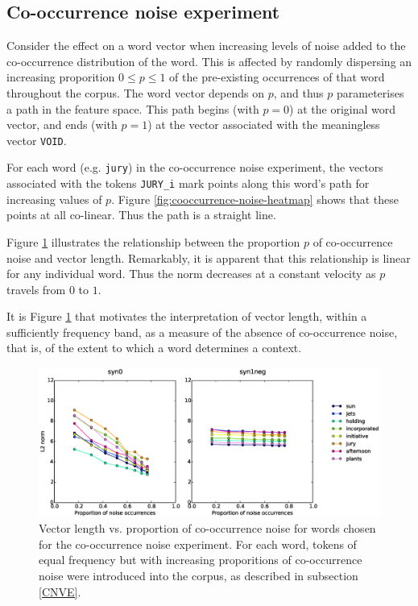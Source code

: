 \documentclass{article} %
\newcommand{\word}[1]{\texttt{#1}}
\begin{document}
\subsection{Co-occurrence noise experiment}
Consider the effect on a word vector when increasing levels of noise added to the co-occurrence distribution of the word.
This is affected by randomly dispersing an increasing proporition $0 \leqslant p \leqslant 1$ of the pre-existing occurrences of that word throughout the corpus.
The word vector depends on $p$, and thus $p$ parameterises a path in the feature space.
This path begins (with $p=0$) at the original word vector, and ends (with $p=1$) at the vector associated with the meaningless vector \word{VOID}.

For each word (e.g. \word{jury}) in the co-occurrence noise experiment, the vectors associated with the tokens \word{JURY\_i} mark points along this word's path for increasing values of $p$.
Figure \ref{fig:cooccurrence-noise-heatmap} shows that these points at all co-linear.
Thus the path is a straight line.

Figure \ref{fig:cooccurrence-noise-graph} illustrates the relationship between the proportion $p$ of co-occurrence noise and vector length.
Remarkably, it is apparent that this relationship is linear for any individual word.
Thus the norm decreases at a constant velocity as $p$ travels from $0$ to $1$.

It is Figure \ref{fig:cooccurrence-noise-graph} that motivates the interpretation of vector length, within a sufficiently frequency band, as a measure of the absence of co-occurrence noise, that is, of the extent to which a word determines a context.

\begin{figure}
\includegraphics[scale=0.6]{cooccurrence-noise-graph}
\caption{
	Vector length vs. proportion of co-occurrence noise for words chosen for the co-occurrence noise experiment.
	For each word, tokens of equal frequency but with increasing proporitions of co-occurrence noise were introduced into the corpus, as described in subsection \ref{CNVE}.
}
\label{fig:cooccurrence-noise-graph}
\end{figure}
\end{document}
